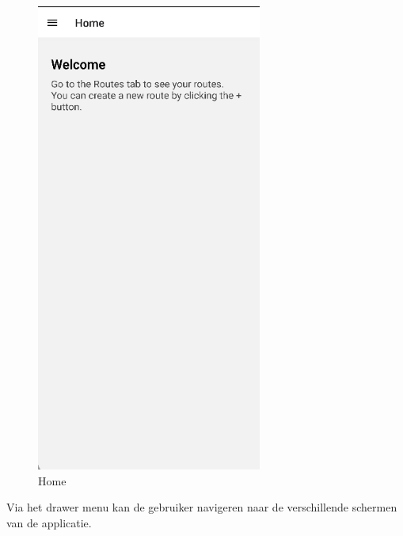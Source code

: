     \begin{figure}[htbp]
        \includegraphics[width=20em]{./graphics/home.png}
        \centering
        \caption{Home}
        \label{fig:home}
    \end{figure}

    Via het drawer menu kan de gebruiker navigeren naar de verschillende schermen van de applicatie.


